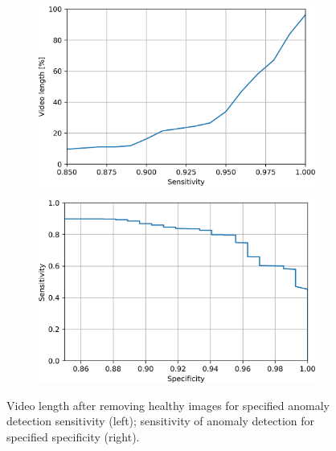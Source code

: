 \documentclass[preprint]{article}
\renewcommand{\twocolumn}{}
\begin{document}
\begin{figure}[ht]
\centering
\begin{subfigure}{.5\textwidth}
  \centering
  \includegraphics[width=.99\linewidth]{shortening.png}
  \label{fig:sub1}
\end{subfigure}%
\begin{subfigure}{.5\textwidth}
  \centering
  \includegraphics[width=.99\linewidth]{specificity.png}
  \label{fig:sub2}
\end{subfigure}
\caption{Video length after removing healthy images for specified anomaly detection sensitivity (left); sensitivity of anomaly detection for specified specificity (right).}
\label{fig3}
\end{figure}
\twocolumn
\end{document}
